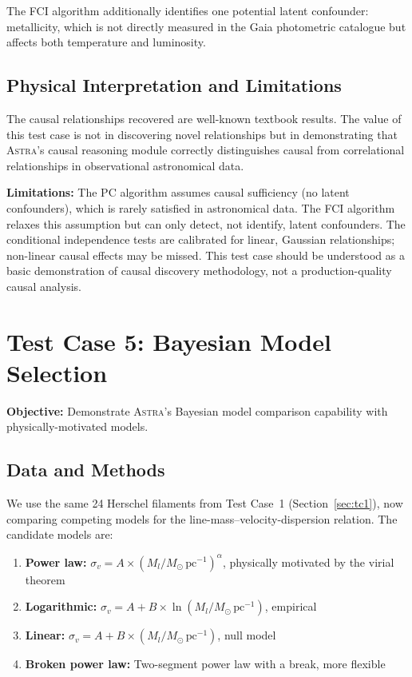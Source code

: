 \documentclass[fleqn,usenatbib]{mnras}
\newcommand{\astra}{\textsc{Astra}\xspace}
\newcommand{\pc}{PC\xspace}
\newcommand{\fci}{FCI\xspace}
\begin{document}
The \fci algorithm additionally identifies one potential latent confounder: metallicity, which is not directly measured in the Gaia photometric catalogue but affects both temperature and luminosity.

\subsection{Physical Interpretation and Limitations}
\label{sec:tc4:interpretation}

The causal relationships recovered are well-known textbook results.
The value of this test case is not in discovering novel relationships but in demonstrating that \astra's causal reasoning module correctly distinguishes causal from correlational relationships in observational astronomical data.

\textbf{Limitations:}
The \pc algorithm assumes causal sufficiency (no latent confounders), which is rarely satisfied in astronomical data.
The \fci algorithm relaxes this assumption but can only detect, not identify, latent confounders.
The conditional independence tests are calibrated for linear, Gaussian relationships; non-linear causal effects may be missed.
This test case should be understood as a basic demonstration of causal discovery methodology, not a production-quality causal analysis.

\section{Test Case 5: Bayesian Model Selection}
\label{sec:tc5}

\textbf{Objective:} Demonstrate \astra's Bayesian model comparison capability with physically-motivated models.

\subsection{Data and Methods}
\label{sec:tc5:data}

We use the same 24 Herschel filaments from Test Case~1 (Section~\ref{sec:tc1}), now comparing competing models for the line-mass--velocity-dispersion relation.
The candidate models are:
\begin{enumerate}
  \item[(i)] \textbf{Power law:} $\sigma_v = A \times (M_l/M_\odot\,\mathrm{pc}^{-1})^{\alpha}$, physically motivated by the virial theorem
  \item[(ii)] \textbf{Logarithmic:} $\sigma_v = A + B \times \ln(M_l/M_\odot\,\mathrm{pc}^{-1})$, empirical
  \item[(iii)] \textbf{Linear:} $\sigma_v = A + B \times (M_l/M_\odot\,\mathrm{pc}^{-1})$, null model
  \item[(iv)] \textbf{Broken power law:} Two-segment power law with a break, more flexible
\end{enumerate}
\end{document}
